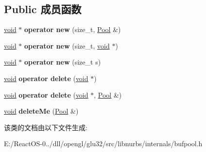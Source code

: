 \subsection*{Public 成员函数}
\begin{DoxyCompactItemize}
\item 
\mbox{\label{class_pooled_obj_a9cb8c5e9fe78bea75d7e66eaaa1acbd2}} 
\hyperlink{interfacevoid}{void} $\ast$ {\bfseries operator new} (size\+\_\+t, \hyperlink{class_pool}{Pool} \&)
\item 
\mbox{\label{class_pooled_obj_ac62a5b3a05f0aa733ba201398a1fb4c3}} 
\hyperlink{interfacevoid}{void} $\ast$ {\bfseries operator new} (size\+\_\+t, \hyperlink{interfacevoid}{void} $\ast$)
\item 
\mbox{\label{class_pooled_obj_a75d606e83338a5a63bd8fef4446a062f}} 
\hyperlink{interfacevoid}{void} $\ast$ {\bfseries operator new} (size\+\_\+t s)
\item 
\mbox{\label{class_pooled_obj_a1de9c89db010ae9c5b61b055c32cfc94}} 
\hyperlink{interfacevoid}{void} {\bfseries operator delete} (\hyperlink{interfacevoid}{void} $\ast$)
\item 
\mbox{\label{class_pooled_obj_a78992ea8c2dfc39b0c0dbb4693222ac2}} 
\hyperlink{interfacevoid}{void} {\bfseries operator delete} (\hyperlink{interfacevoid}{void} $\ast$, \hyperlink{class_pool}{Pool} \&)
\item 
\mbox{\label{class_pooled_obj_a2a7cb5326105bfa121082f3ebf983352}} 
\hyperlink{interfacevoid}{void} {\bfseries delete\+Me} (\hyperlink{class_pool}{Pool} \&)
\end{DoxyCompactItemize}


该类的文档由以下文件生成\+:\begin{DoxyCompactItemize}
\item 
E\+:/\+React\+O\+S-\/0../dll/opengl/glu32/src/libnurbs/internals/bufpool.\+h\end{DoxyCompactItemize}
